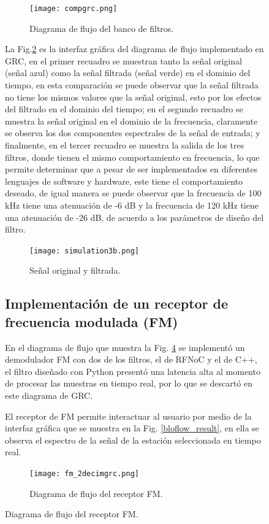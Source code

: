 \documentclass[12pt]{difu100cia} %
\begin{document}
\begin{figure}[!ht]
\begin{figure}[!htb]
	\centering
	\texttt{[image: compgrc.png]}
	\caption{Diagrama de flujo del banco de filtros.}
	\label{bloque_py_flow}
\end{figure}

La Fig.\ref{bloque_simulacion_3} es la interfaz gráfica del diagrama de flujo implementado en GRC, en el primer recuadro se muestran tanto la señal original (señal azul) como la señal filtrada (señal verde) en el dominio del tiempo, en esta comparación se puede observar que la señal filtrada no tiene los mismos valores que la señal original, esto por los efectos del filtrado en el dominio del tiempo; en el segundo recuadro se muestra la señal original en el dominio de la frecuencia, claramente se observa los dos componentes espectrales de la señal de entrada; y finalmente, en el tercer recuadro se muestra la salida de los tres filtros, donde tienen el mismo comportamiento en frecuencia, lo que permite determinar que a pesar de ser implementados en diferentes lenguajes de software y hardware, este tiene el comportamiento deseado, de igual manera se puede observar que la frecuencia de 100 kHz tiene una atenuación de -6 dB y la frecuencia de 120 kHz tiene una atenuación de -26 dB, de acuerdo a los parámetros de diseño del filtro.

\begin{figure}[!ht]
	\centering
	\texttt{[image: simulation3b.png]}
	\caption{Señal original y filtrada.}
	\label{bloque_simulacion_3}
\end{figure}

\subsection{Implementación de un receptor de frecuencia modulada (FM)}

En el diagrama de flujo que muestra la Fig. \ref{diagramaflujo2filtrosfm} se implementó un demodulador FM con dos de los filtros, el de RFNoC y el de C++, el filtro diseñado con Python presentó una latencia alta al momento de procesar las muestras en tiempo real, por lo que se descartó en este diagrama de GRC.

El receptor de FM permite interactuar al usuario por medio de la interfaz gráfica que se muestra en la Fig. \ref{bloflow_result}, en ella se observa el espectro de la señal de la estación seleccionada en tiempo real. 

\begin{figure}[!ht]
	\centering
	\texttt{[image: fm\_2decimgrc.png]}
	\caption{Diagrama de flujo del receptor FM.}
	\label{diagramaflujo2filtrosfm}
\end{figure}


\end{figure}
\end{document}
